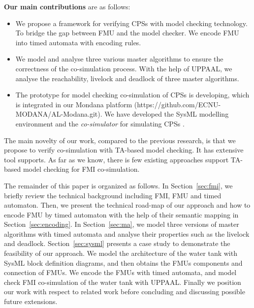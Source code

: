 \textbf{Our main contributions} are as follows:
\begin{itemize}
\item
We propose a framework for verifying CPSs with model checking technology. To bridge the gap between FMU and the model checker. We encode FMU into timed automata with encoding rules.
\item
We model and analyse three various master algorithms to ensure the correctness of the co-simulation process. With the help of UPPAAL, we analyse the reachability, livelock and deadlock of three master algorithms.
\item
The prototype for model checking co-simulation of CPSs is developing, which is integrated in our Mondana platform \cite{Cheng2015Modana}(https://github.com/ECNU-MODANA/AL-Modana.git). We have developed the SysML modelling environment and the \textit{co-simulator} for simulating CPSs \cite{Fritzson1998Modelica}.
\end{itemize}
The main novelty of our work, compared to the previous research, is that we propose to verify co-simulation with TA-based model checking. It has extensive tool supports. As far as we know, there is few existing approaches support TA-based model checking for FMI co-simulation.

The remainder of this paper is organized as follows. In Section~\ref{sec:fmi}, we briefly review the technical background including FMI, FMU and timed automaton. Then, we present the technical road-map of our approach and how to encode FMU by timed automaton with the help of their semantic mapping in Section~\ref{sec:encoding}. In Section~\ref{sec:ma}, we model three versions of master algorithms with timed automata and analyse their properties such as the livelock and deadlock. Section~\ref{sec:sysml} presents a case study to demonstrate the feasibility of our approach. We model the architecture of the water tank with SysML block definition diagrams, and then obtains the FMUs components and connection of FMUs. We encode the FMUs with timed automata, and model check FMI co-simulation of the water tank with UPPAAL. Finally we position our work with respect to related work before concluding and discussing possible future extensions.




















